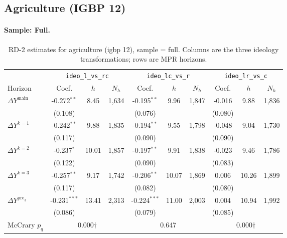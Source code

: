 \documentclass[11pt]{article}
\begin{document}
\clearpage
\subsection{Agriculture (IGBP 12)}
\paragraph{Sample: Full.}
\begin{table}[H]
\centering
\scriptsize
\caption{RD-2 estimates for agriculture (igbp 12), sample = full.
Columns are the three ideology transformations; rows are MPR horizons.}
\label{tab:rd2_agriculture_all}
\begin{tabular}{l ccc ccc ccc}
\toprule
 & \multicolumn{3}{c}{\texttt{ideo\_l\_vs\_rc}}
 & \multicolumn{3}{c}{\texttt{ideo\_lc\_vs\_r}}
 & \multicolumn{3}{c}{\texttt{ideo\_lr\_vs\_c}} \\
\cmidrule(lr){2-4} \cmidrule(lr){5-7} \cmidrule(lr){8-10}
Horizon & Coef. & $h$ & $N_h$ & Coef. & $h$ & $N_h$ & Coef. & $h$ & $N_h$ \\
\midrule
$\Delta Y^{\text{main}}$ & -0.272$^{**}$ & 8.45 & 1,634 & -0.195$^{**}$ & 9.96 & 1,847 & -0.016 & 9.88 & 1,836 \\
 & (0.108) &  &  & (0.076) &  &  & (0.080) &  &  \\
\addlinespace[1pt]
$\Delta Y^{k=1}$ & -0.242$^{**}$ & 9.88 & 1,835 & -0.194$^{**}$ & 9.55 & 1,798 & -0.048 & 9.04 & 1,730 \\
 & (0.117) &  &  & (0.090) &  &  & (0.090) &  &  \\
\addlinespace[1pt]
$\Delta Y^{k=2}$ & -0.237$^{*}$ & 10.01 & 1,857 & -0.197$^{**}$ & 9.91 & 1,838 & -0.023 & 9.46 & 1,786 \\
 & (0.122) &  &  & (0.090) &  &  & (0.083) &  &  \\
\addlinespace[1pt]
$\Delta Y^{k=3}$ & -0.257$^{**}$ & 9.17 & 1,742 & -0.206$^{**}$ & 10.07 & 1,869 & 0.006 & 10.26 & 1,899 \\
 & (0.117) &  &  & (0.082) &  &  & (0.080) &  &  \\
\addlinespace[1pt]
$\Delta Y^{\text{pre}_3}$ & -0.231$^{***}$ & 13.41 & 2,313 & -0.224$^{***}$ & 11.00 & 2,003 & 0.004 & 10.94 & 1,992 \\
 & (0.086) &  &  & (0.079) &  &  & (0.085) &  &  \\
\addlinespace[1pt]
\midrule
McCrary $p_q$ & \multicolumn{3}{c}{0.000$\dagger$} & \multicolumn{3}{c}{0.647} & \multicolumn{3}{c}{0.000$\dagger$} \\
\bottomrule
\end{tabular}
\end{table}
\end{document}
